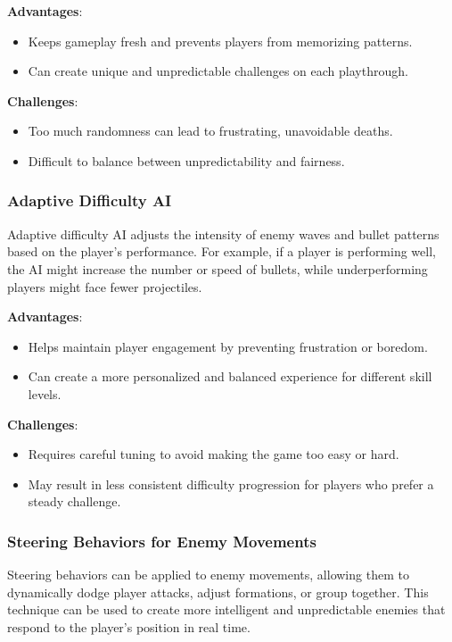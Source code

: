 \textbf{Advantages}:
\begin{itemize}
    \item Keeps gameplay fresh and prevents players from memorizing patterns.
    \item Can create unique and unpredictable challenges on each playthrough.
\end{itemize}

\textbf{Challenges}:
\begin{itemize}
    \item Too much randomness can lead to frustrating, unavoidable deaths.
    \item Difficult to balance between unpredictability and fairness.
\end{itemize}

\subsubsection{Adaptive Difficulty AI}

Adaptive difficulty AI adjusts the intensity of enemy waves and bullet patterns based on the player’s performance. For example, if a player is performing well, the AI might increase the number or speed of bullets, while underperforming players might face fewer projectiles.

\textbf{Advantages}:
\begin{itemize}
    \item Helps maintain player engagement by preventing frustration or boredom.
    \item Can create a more personalized and balanced experience for different skill levels.
\end{itemize}

\textbf{Challenges}:
\begin{itemize}
    \item Requires careful tuning to avoid making the game too easy or hard.
    \item May result in less consistent difficulty progression for players who prefer a steady challenge.
\end{itemize}

\subsubsection{Steering Behaviors for Enemy Movements}

Steering behaviors can be applied to enemy movements, allowing them to dynamically dodge player attacks, adjust formations, or group together. This technique can be used to create more intelligent and unpredictable enemies that respond to the player's position in real time.

